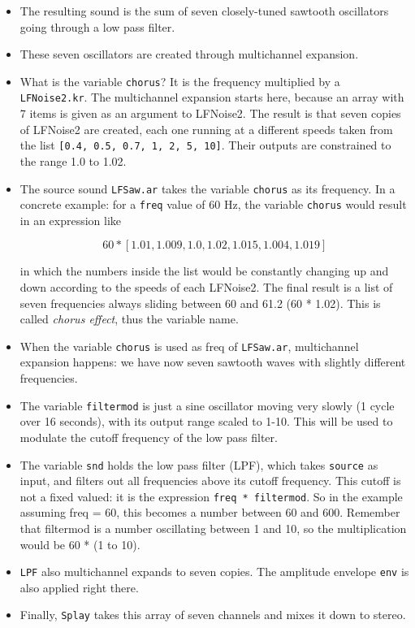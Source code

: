 \begin{itemize}
\item The resulting sound is the sum of seven closely-tuned sawtooth oscillators going through a low pass filter.
\item These seven oscillators are created through multichannel expansion.
\item What is the variable \texttt{chorus}? It is the frequency multiplied by a \texttt{LFNoise2.kr}. The multichannel expansion starts here, because an array with 7 items is given as an argument to LFNoise2. The result is that seven copies of LFNoise2 are created, each one running at a different speeds taken from the list \texttt{[0.4, 0.5, 0.7, 1, 2, 5, 10]}. Their outputs are constrained to the range 1.0 to 1.02.
\item The source sound \texttt{LFSaw.ar} takes the variable \texttt{chorus} as its frequency. In a concrete example: for a \texttt{freq} value of 60 Hz, the variable \texttt{chorus} would result in an expression like

$$60 * [1.01, 1.009, 1.0, 1.02, 1.015, 1.004, 1.019]$$

in which the numbers inside the list would be constantly changing up and down according to the speeds of each LFNoise2. The final result is a list of seven frequencies always sliding between 60 and 61.2 (60 * 1.02). This is called \textit{chorus effect}, thus the variable name.
\item When the variable \texttt{chorus} is used as freq of \texttt{LFSaw.ar}, multichannel expansion happens: we have now seven sawtooth waves with slightly different frequencies.
\item The variable \texttt{filtermod} is just a sine oscillator moving very slowly (1 cycle over 16 seconds), with its output range scaled to 1-10. This will be used to modulate the cutoff frequency of the low pass filter.
\item The variable \texttt{snd} holds the low pass filter (LPF), which takes \texttt{source} as input, and filters out all frequencies above its cutoff frequency. This cutoff is not a fixed valued: it is the expression \texttt{freq * filtermod}. So in the example assuming freq = 60, this becomes a number between 60 and 600. Remember that filtermod is a number oscillating between 1 and 10, so the multiplication would be 60 * (1 to 10).
\item \texttt{LPF} also multichannel expands to seven copies. The amplitude envelope \texttt{env} is also applied right there.
\item Finally, \texttt{Splay} takes this array of seven channels and mixes it down to stereo.

\end{itemize}
 

